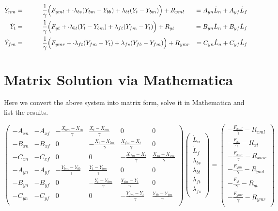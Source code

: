 \documentclass[11pt, landscape]{article}
\newcommand{\mn}{\scalebox{0.7}[1.0]{-}}
\begin{document}
\begin{align}  
  \dot{Y}_{nm} &= \hspace{1cm} \frac{1}{\gamma} \Big(F_{yml} + \mn \lambda_{bs}(Y_{bm} - Y_{bb}) + \lambda_{bt}(Y_{t } - Y_{bm}) \Big) + R_{yml} &= A_{yn}\dot{L}_n + A_{yf}\dot{L}_f\\
  \dot{Y}_{t}  &= \hspace{1cm} \frac{1}{\gamma} \Big(F_{yt } + \mn \lambda_{bt}(Y_{t } - Y_{bm}) + \lambda_{ft}(Y_{fm} - Y_{t }) \Big) + R_{yt } &= B_{yn}\dot{L}_n + B_{yf}\dot{L}_f\\
  \dot{Y}_{fm} &= \hspace{1cm} \frac{1}{\gamma} \Big(F_{ymr} + \mn \lambda_{ft}(Y_{fm} - Y_{t }) + \lambda_{fs}(Y_{fb} - Y_{fm}) \Big) + R_{ymr} &= C_{yn}\dot{L}_n + C_{yf}\dot{L}_f
\end{align}

\section{Matrix Solution via Mathematica}
Here we convert the above system into matrix form, solve it in Mathematica and list the results.

\[
\begin{pmatrix}
  -A_{xn} & -A_{xf} & -\frac{X_{bm}-X_{bb}}{\gamma} & \frac{X_{t}-X_{bm}}{\gamma} & 0 & 0\\
  -B_{xn} & -B_{xf} & 0 & -\frac{X_{t}-X_{bm}}{\gamma} & \frac{X_{fm}-X_{t}}{\gamma} & 0\\
  -C_{xn} & -C_{xf} & 0 & 0 & -\frac{X_{fm}-X_{t}}{\gamma} & \frac{X_{fb}-X_{fm}}{\gamma}\\
  -A_{yn} & -A_{yf} & -\frac{Y_{bm}-Y_{bb}}{\gamma} & \frac{Y_{t}-Y_{bm}}{\gamma} & 0 & 0\\
  -B_{yn} & -B_{yf} & 0 & -\frac{Y_{t}-Y_{bm}}{\gamma} & \frac{Y_{fm}-Y_{t}}{\gamma} & 0\\
  -C_{yn} & -C_{yf} & 0 & 0 & -\frac{Y_{fm}-Y_{t}}{\gamma} & \frac{Y_{fb}-Y_{fm}}{\gamma}\\
\end{pmatrix}
\begin{pmatrix}
  \dot{L}_n\\
  \dot{L}_f\\
  \lambda_{bs}\\
  \lambda_{bt}\\
  \lambda_{ft}\\
  \lambda_{fs}\\
\end{pmatrix}
=
\begin{pmatrix}
  -\frac{F_{xml}}{\gamma} - R_{xml}\\
  -\frac{F_{xt}}{\gamma} - R_{xt}\\
  -\frac{F_{xmr}}{\gamma} - R_{xmr}\\
  -\frac{F_{yml}}{\gamma} - R_{yml}\\
  -\frac{F_{yt}}{\gamma} - R_{yt}\\
  -\frac{F_{ymr}}{\gamma} - R_{ymr}\\
\end{pmatrix}
\]
\end{document}
